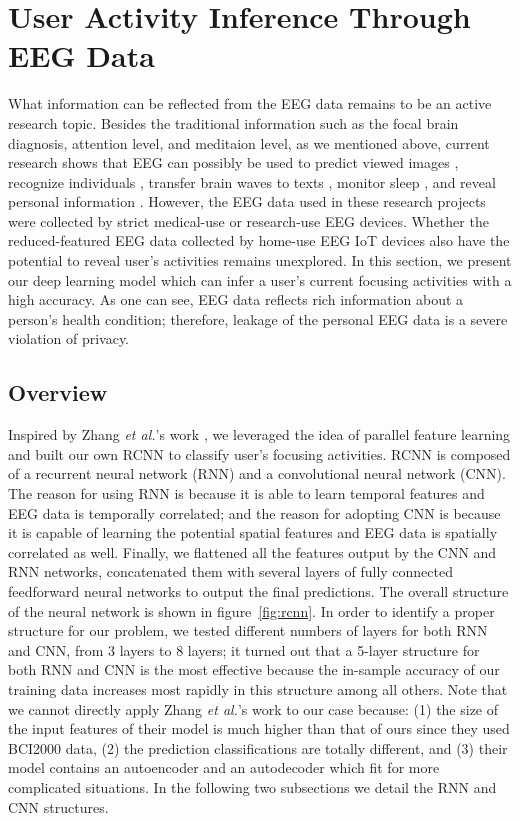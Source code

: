 \section{User Activity Inference Through EEG Data}
\label{sec:inference}

What information can be reflected from the EEG data remains to be an active research topic. Besides the traditional information such as the focal brain diagnosis, attention level, and meditaion level, as we mentioned above, current research shows that EEG can possibly be used to predict viewed images \cite{mindreading2017}, recognize individuals \cite{chu2017individual}, transfer brain waves to texts \cite{zhang2017converting}, monitor sleep \cite{nakamura2017automatic},  and reveal personal information \cite{martinovic2012feasibility}. However, the EEG data used in these research projects were collected by strict medical-use or research-use EEG devices. Whether the reduced-featured EEG data collected by home-use EEG IoT devices also have the potential to reveal user's activities remains unexplored. In this section, we present our deep learning model which can infer a user's current focusing activities with a high accuracy. As one can see, EEG data reflects rich information about a person's health condition; therefore, leakage of the personal EEG data is a severe violation of privacy.

\subsection{Overview}
Inspired by Zhang \emph{et al.}'s work \cite{zhang2017converting,hochreiter1997long}, we leveraged the idea of parallel feature learning and built our own RCNN to classify user's focusing activities. RCNN is composed of a recurrent neural network (RNN) and a convolutional neural network (CNN). The reason for using RNN is because it is able to learn temporal features and EEG data is temporally correlated; and the reason for adopting CNN is because it is capable of learning the potential spatial features and EEG data is spatially correlated as well. Finally, we flattened all the features output by the CNN and RNN networks, concatenated them with several layers of fully connected feedforward neural networks to output the final predictions. The overall structure of the neural network is shown in figure~\ref{fig:rcnn}. In order to identify a proper structure for our problem, we tested different numbers of layers for both RNN and CNN, from 3 layers to 8 layers; it turned out that a 5-layer structure for both RNN and CNN is the most effective because the in-sample accuracy of our training data increases most rapidly in this structure among all others. Note that we cannot directly apply Zhang \emph{et al.}'s work to our case because: (1) the size of the input features of their model is much higher than that of ours since they used BCI2000 data, (2) the prediction classifications are totally different, and (3) their model contains an autoencoder and an autodecoder which fit for more complicated situations. %
In the following two subsections we detail the RNN and CNN structures. 

